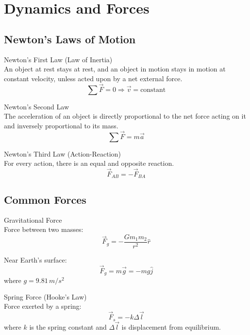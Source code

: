 \section{Dynamics and Forces}

\subsection{Newton's Laws of Motion}

\begin{concept}{Newton's First Law (Law of Inertia)}\\
    An object at rest stays at rest, and an object in motion stays in motion at constant velocity, unless acted upon by a net external force.
    $$\sum \vec{F} = 0 \Rightarrow \vec{v} = \text{constant}$$
\end{concept}

\begin{concept}{Newton's Second Law}\\
    The acceleration of an object is directly proportional to the net force acting on it and inversely proportional to its mass.
    $$\sum \vec{F} = m\vec{a}$$
\end{concept}

\begin{concept}{Newton's Third Law (Action-Reaction)}\\
    For every action, there is an equal and opposite reaction.
    $$\vec{F}_{AB} = -\vec{F}_{BA}$$
\end{concept}

\subsection{Common Forces}

\begin{definition}{Gravitational Force}\\
    Force between two masses:
    $$\vec{F}_g = -\frac{Gm_1m_2}{r^2}\hat{r}$$
    
    Near Earth's surface:
    $$\vec{F}_g = m\vec{g} = -mg\hat{j}$$
    where $g = 9.81 \, m/s^2$
\end{definition}

\begin{definition}{Spring Force (Hooke's Law)}\\
    Force exerted by a spring:
    $$\vec{F}_s = -k\Delta\vec{l}$$
    where $k$ is the spring constant and $\Delta\vec{l}$ is displacement from equilibrium.
\end{definition}

